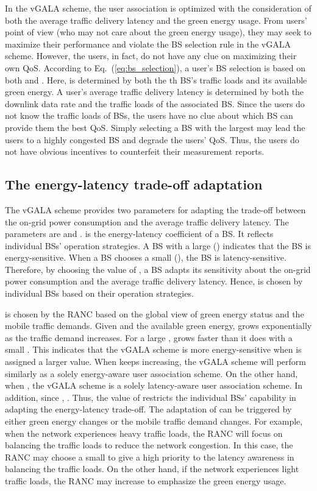 \documentclass[journal]{IEEEtran}
\theoremstyle{definition}
\begin{document}
In the vGALA scheme, the user association is optimized with the consideration of both the average traffic delivery latency and the green energy usage. From users' point of view (who may not care about the green energy usage), they may seek to maximize their performance and violate the BS selection rule in the vGALA scheme. However, the users, in fact, do not have any clue on maximizing their own QoS. According to Eq.~(\ref{eq:bs_selection}), a user's BS selection is based on both  and . Here,  is determined by both the th BS's traffic loads and its available green energy. A user's average traffic delivery latency is determined by both the downlink data rate and the traffic loads of the associated BS. Since the users do not know the traffic loads of BSs, the users have no clue about which BS can provide them the best QoS. Simply selecting a BS with the largest  may lead the users to a highly congested BS and degrade the users' QoS. Thus, the users do not have obvious incentives to counterfeit their measurement reports.


\subsection{The energy-latency trade-off adaptation}
\label{subsec:energy_latency_trade}
The vGALA scheme provides two parameters for adapting the trade-off between the on-grid power consumption and the average traffic delivery latency. The parameters are  and .  is the energy-latency coefficient of a BS. It reflects individual BSs' operation strategies. A BS with a large  () indicates that the BS is energy-sensitive. When a BS chooses a small  (), the BS is latency-sensitive. Therefore, by choosing the value of , a BS adapts its sensitivity about the on-grid power consumption and the average traffic delivery latency. Hence,  is chosen by individual BSs based on their operation strategies.

 is chosen by the RANC based on the global view of green energy status and the mobile traffic demands. Given  and the available green energy,  grows exponentially as the traffic demand increases. For a large ,  grows faster than it does with a small . This indicates that the vGALA scheme is more energy-sensitive when  is assigned a larger value. When  keeps increasing, the vGALA scheme will perform similarly as a solely energy-aware user association scheme. On the other hand, when , the vGALA scheme is a solely latency-aware user association scheme. In addition, since , . Thus, the value of  restricts the individual BSs' capability in adapting the energy-latency trade-off. The adaptation of  can be triggered by either green energy changes or the mobile traffic demand changes. For example, when the network experiences heavy traffic loads, the RANC will focus on balancing the traffic loads to reduce the network congestion. In this case, the RANC may choose a small  to give a high priority to the latency awareness in balancing the traffic loads. On the other hand, if the network experiences light traffic loads, the RANC may increase  to emphasize the green energy usage.
\end{document}
